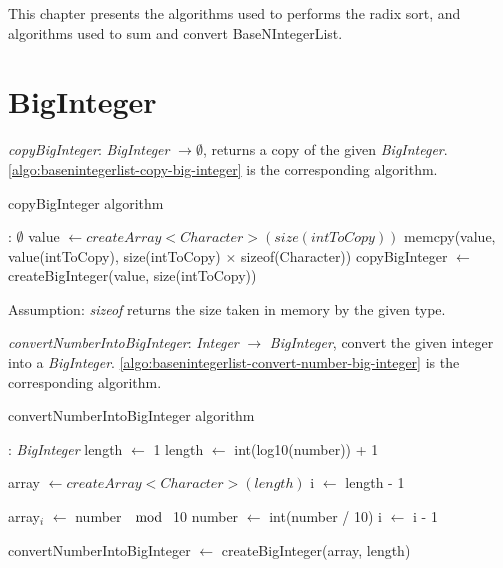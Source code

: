 \documentclass[book, nodocumentinfo]{upmethodology-document}
\begin{document}
This chapter presents the algorithms used to performs the
radix sort, and algorithms used to sum and convert BaseNIntegerList.

\section{BigInteger}

\emph{copyBigInteger}: \emph{BigInteger} \(\rightarrow \emptyset\),
    returns a copy of the given \emph{BigInteger}.
    \ref{algo:basenintegerlist-copy-big-integer} is the corresponding algorithm.

\begin{algorithm}[H]
    \caption{copyBigInteger algorithm}
    \label{algo:basenintegerlist-copy-big-integer}

    \begin{algorithmic}
         : \(\emptyset\)
            \State value \(\leftarrow createArray<Character>(size(intToCopy))\)
            \State memcpy(value, value(intToCopy), size(intToCopy) \(×\) sizeof(Character))
            \State copyBigInteger \(\leftarrow\) createBigInteger(value, size(intToCopy))
        \EndFunction
    \end{algorithmic}
\end{algorithm}

Assumption: \emph{sizeof} returns the size taken in memory by the given type.

\emph{convertNumberIntoBigInteger}: \emph{Integer} \(\rightarrow\) \emph{BigInteger},
    convert the given integer into a \emph{BigInteger}.
    \ref{algo:basenintegerlist-convert-number-big-integer} is the corresponding algorithm.

\begin{algorithm}[H]
    \caption{convertNumberIntoBigInteger algorithm}
    \label{algo:basenintegerlist-convert-number-big-integer}

    \begin{algorithmic}
         : \emph{BigInteger}
                \State length \(\leftarrow\) 1
            \Else
                \State length \(\leftarrow\) int(log10(number)) + 1
            \EndIf

            \State array \(\leftarrow createArray<Character>(length)\)
            \State i \(\leftarrow\) length - 1

            \Repeat
                \State array\(_i\) \(\leftarrow\) number \(\mod\) 10
                \State number \(\leftarrow\) int(number / 10)
                \State i \(\leftarrow\) i - 1

            \State convertNumberIntoBigInteger \(\leftarrow\) createBigInteger(array, length)
        \EndFunction
    \end{algorithmic}
\end{algorithm}
\end{document}
